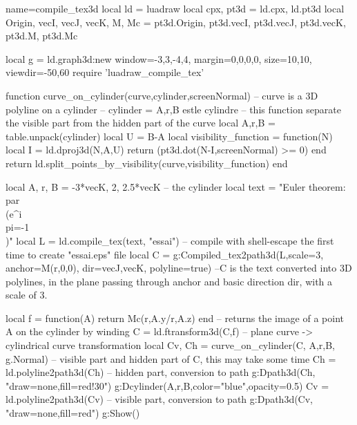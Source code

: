 \begin{luadraw}{name=compile_tex3d}
local ld = luadraw
local cpx, pt3d = ld.cpx, ld.pt3d
local Origin, vecI, vecJ, vecK, M, Mc = pt3d.Origin, pt3d.vecI, pt3d.vecJ, pt3d.vecK, pt3d.M, pt3d.Mc

local g = ld.graph3d:new{ window={-3,3,-4,4}, margin={0,0,0,0}, size={10,10}, viewdir={-50,60}}
require 'luadraw_compile_tex'

function curve_on_cylinder(curve,cylinder,screenNormal) 
-- curve is a 3D polyline on a cylinder
-- cylinder = {A,r,B} estle cylindre
-- this function separate the visible part from the hidden part of the curve
    local A,r,B = table.unpack(cylinder)
    local U = B-A
    local visibility_function = function(N)
        local I = ld.dproj3d(N,{A,U})
        return (pt3d.dot(N-I,screenNormal) >= 0)
    end
    return ld.split_points_by_visibility(curve,visibility_function)
end

local A, r, B = -3*vecK, 2, 2.5*vecK -- the cylinder
local text = "Euler theorem: \\par \\(e^{i\\pi}=-1\\)"
local L = ld.compile_tex(text, "essai") -- compile with shell-escape the first time to create "essai.eps" file
local C = g:Compiled_tex2path3d(L,{scale=3, anchor=M(r,0,0), dir={vecJ,vecK}, polyline=true})
--C is the text converted into 3D polylines, in the plane passing through anchor and basic direction dir, with a scale of 3.

local f = function(A) return Mc(r,A.y/r,A.z) end -- returns the image of a point A on the cylinder by winding
C = ld.ftransform3d(C,f) -- plane curve -> cylindrical curve transformation
local Cv, Ch = curve_on_cylinder(C, {A,r,B}, g.Normal) -- visible part and hidden part of C, this may take some time
Ch = ld.polyline2path3d(Ch) -- hidden part, conversion to path
g:Dpath3d(Ch, "draw=none,fill=red!30")
g:Dcylinder(A,r,B,{color="blue",opacity=0.5})
Cv = ld.polyline2path3d(Cv) -- visible part, conversion to path
g:Dpath3d(Cv, "draw=none,fill=red")
g:Show()
\end{luadraw}
